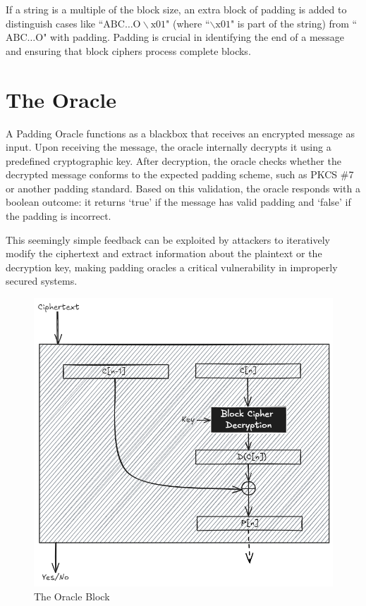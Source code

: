 \documentclass[conference]{IEEEtran}
\begin{document}
If a string is a multiple of the block size, an extra block of padding is added to distinguish cases like ``$\text{ABC}\ldots\text{O}\backslash \text{x}01$" (where ``$\backslash \text{x}01$" is part of the string) from ``$\text{ABC}\ldots\text{O}$" with padding.
Padding is crucial in identifying the end of a message and ensuring that block ciphers process complete blocks.

\section{The Oracle}
A Padding Oracle functions as a blackbox that receives an encrypted message as input. Upon receiving the message, the oracle internally decrypts it using a predefined cryptographic key. After decryption, the oracle checks whether the decrypted message conforms to the expected padding scheme, such as PKCS \#7 or another padding standard. Based on this validation, the oracle responds with a boolean outcome: it returns `true' if the message has valid padding and `false' if the padding is incorrect. 

This seemingly simple feedback can be exploited by attackers to iteratively modify the ciphertext and extract information about the plaintext or the decryption key, making padding oracles a critical vulnerability in improperly secured systems.
\begin{figure}[!htb]
    \centering
    \includegraphics[width=0.8\linewidth]{./../oracle.png}
    \caption{The Oracle Block}
    \label{fig:oracle}
\end{figure}
\end{document}
